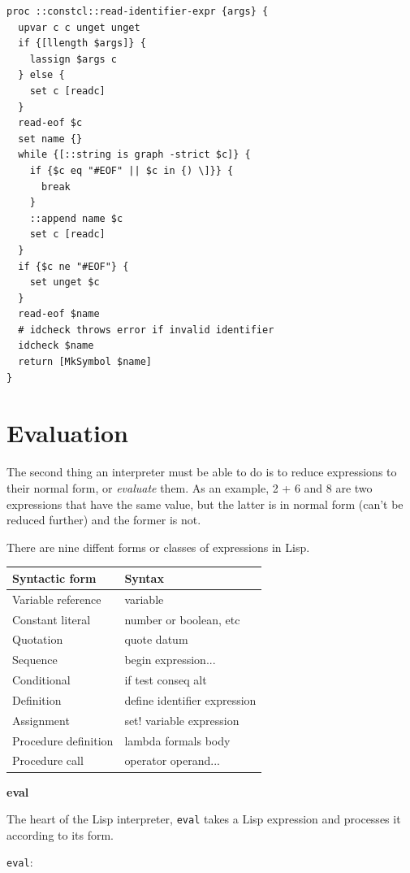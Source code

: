 \documentclass[twoside,9pt]{report}
\begin{document}
\noindent\makebox[\linewidth]{\rule{\linewidth}{0.4pt}}
\begin{lstlisting}
proc ::constcl::read-identifier-expr {args} {
  upvar c c unget unget
  if {[llength $args]} {
    lassign $args c
  } else {
    set c [readc]
  }
  read-eof $c
  set name {}
  while {[::string is graph -strict $c]} {
    if {$c eq "#EOF" || $c in {) \]}} {
      break
    }
    ::append name $c
    set c [readc]
  }
  if {$c ne "#EOF"} {
    set unget $c
  }
  read-eof $name
  # idcheck throws error if invalid identifier
  idcheck $name
  return [MkSymbol $name]
}
\end{lstlisting}
\noindent\makebox[\linewidth]{\rule{\linewidth}{0.4pt}}
\chapter{Evaluation}
\label{evaluation}

The second thing an interpreter must be able to do is to reduce expressions to their normal form, or \emph{evaluate} them. As an example, 2 + 6 and 8 are two expressions that have the same value, but the latter is in normal form (can't be reduced further) and the former is not.


There are nine diffent forms or classes of expressions in Lisp.

\begin{tabular}{|l l|}
\hline
Syntactic form & Syntax \\
\hline
Variable reference & variable \\
Constant literal & number or boolean, etc \\
Quotation & quote datum \\
Sequence & begin expression... \\
Conditional & if test conseq alt \\
Definition & define identifier expression \\
Assignment & set! variable expression \\
Procedure definition & lambda formals body \\
Procedure call & operator operand... \\
\hline
\end{tabular}


\textbf{eval}


The heart of the Lisp interpreter, \texttt{eval} takes a Lisp expression and processes it according to its form.


\texttt{eval}:
\end{document}
